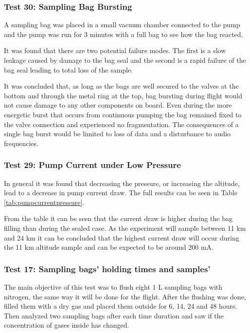\subsubsection{Test 30: Sampling Bag Bursting}
\label{sec:test30result}

A sampling bag was placed in a small vacuum chamber connected to the pump and the pump was run for 3 minutes with a full bag to see how the bag reacted. 

It was found that there are two potential failure modes. The first is a slow leakage caused by damage to the bag seal and the second is  a rapid failure of the bag seal leading to total loss of the sample.

It was concluded that, as long as the bags are well secured to the valves at the bottom and through the metal ring at the top, bag bursting during flight would not cause damage to any other components on board. Even during the more energetic burst that occurs from continuous pumping the bag remained fixed to the valve connection and experienced no fragmentation. The consequences of a single bag burst would be limited to loss of data and a disturbance to audio frequencies. 

\subsubsection{Test 29: Pump Current under Low Pressure}
\label{sec:test29result}

In general it was found that decreasing the pressure, or increasing the altitude, lead to a decrease in pump current draw. The full results can be seen in Table \ref{tab:pumpcurrentpressure}. 



From the table it can be seen that the current draw is higher during the bag filling than during the sealed case. As the experiment will sample between 11 km and 24 km it can be concluded that the highest current draw will occur during the 11 km altitude sample and can be expected to be around 200 mA. 

\subsubsection{Test 17: Sampling bags' holding times and samples'}
\label{sec:test17result}

The main objective of this test was to flush eight 1 L sampling bags with nitrogen, the same way it will be done for the flight. After the flushing was done, filled them with a dry gas and placed them outside for 6, 14, 24 and 48 hours. Then analyzed two sampling bags after each time duration and saw if the concentration of gases inside has changed. 

